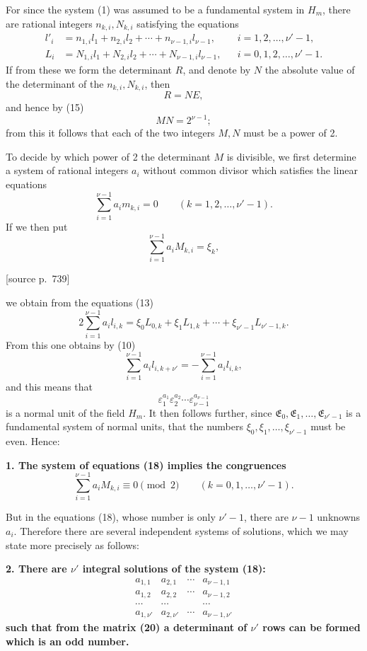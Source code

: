 \documentclass[11pt]{article}
\newcommand{\srcpage}[1]{\par\medskip\noindent\textsf{[source p.~#1]}\par\smallskip}
\begin{document}
For since the system (1) was assumed to be a fundamental system in $H_m$, there are rational integers $n_{k,i},N_{k,i}$ satisfying the equations
\begin{equation}
\begin{aligned}
l'_i&=n_{1,i}l_1+n_{2,i}l_2+\cdots+n_{\nu-1,i}l_{\nu-1},&& i=1,2,\ldots,\nu'-1,\\
L_i&=N_{1,i}l_1+N_{2,i}l_2+\cdots+N_{\nu-1,i}l_{\nu-1},&& i=0,1,2,\ldots,\nu'-1.
\end{aligned}
\tag{17}
\end{equation}
If from these we form the determinant $R$, and denote by $N$ the absolute value of the determinant of the $n_{k,i},N_{k,i}$, then
\[
R=NE,
\]
and hence by (15)
\[
MN=2^{\nu-1};
\]
from this it follows that each of the two integers $M,N$ must be a power of 2.

To decide by which power of 2 the determinant $M$ is divisible, we first determine a system of rational integers $a_i$ without common divisor which satisfies the linear equations
\begin{equation}
\sum_{i=1}^{\nu-1}a_im_{k,i}=0\qquad(k=1,2,\ldots,\nu'-1).
\tag{18}
\end{equation}
If we then put
\[
\sum_{i=1}^{\nu-1}a_iM_{k,i}=\xi_k,
\]
\srcpage{739}
we obtain from the equations (13)
\[
2\sum_{i=1}^{\nu-1}a_il_{i,k}=\xi_0L_{0,k}+\xi_1L_{1,k}+\cdots+\xi_{\nu'-1}L_{\nu'-1,k}.
\]
From this one obtains by (10)
\[
\sum_{i=1}^{\nu-1}a_il_{i,k+\nu'}=-\sum_{i=1}^{\nu-1}a_il_{i,k},
\]
and this means that
\[
\varepsilon_1^{a_1}\varepsilon_2^{a_2}\cdots\varepsilon_{\nu-1}^{a_{\nu-1}}
\]
is a normal unit of the field $H_m$. It then follows further, since $\mathfrak E_0,\mathfrak E_1,\ldots,\mathfrak E_{\nu'-1}$ is a fundamental system of normal units, that the numbers $\xi_0,\xi_1,\ldots,\xi_{\nu'-1}$ must be even. Hence:

\begin{center}\textbf{1. The system of equations (18) implies the congruences
\[
\sum_{i=1}^{\nu-1}a_iM_{k,i}\equiv0\pmod2\qquad(k=0,1,\ldots,\nu'-1).
\tag{19}
\]}\end{center}

But in the equations (18), whose number is only $\nu'-1$, there are $\nu-1$ unknowns $a_i$. Therefore there are several independent systems of solutions, which we may state more precisely as follows:

\begin{center}\textbf{2. There are $\nu'$ integral solutions of the system (18):}
\[
\begin{array}{cccc}
a_{1,1}&a_{2,1}&\cdots&a_{\nu-1,1}\\
a_{1,2}&a_{2,2}&\cdots&a_{\nu-1,2}\\
\cdots&\cdots&&\cdots\\
a_{1,\nu'}&a_{2,\nu'}&\cdots&a_{\nu-1,\nu'}
\end{array}
\tag{20}
\]
\textbf{such that from the matrix (20) a determinant of $\nu'$ rows can be formed which is an odd number.}\end{center}
\end{document}

